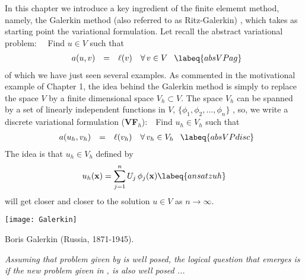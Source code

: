 In this chapter we introduce a key ingredient
of the finite elememt method, namely, the
Galerkin method (also referred to as Ritz-Galerkin) ,
which takes as starting point the variational formulation. 
Let recall the abstract variational problem:~~
Find $u \in V$ such that
\begin{equation}
\left.
\begin{array}{rll}
a(u,v) & = & \ell(v)  ~~~\forall \, v \in V \\
\end{array}
\right. \labeq{absVPag}
\end{equation}
of which we have just seen several examples.
As commented in the motivational example of Chapter 1, 
the idea behind the Galerkin method is simply to replace
the space $V$ by a finite dimensional space $V_h \subset V$.
The space $V_h$ can be spanned by a set of linearly
independent functions in $V$, $\{\phi_1,\phi_2,\dots,\phi_n\}$
,
so, we write a discrete variational
formulation (\textbf{VF}$_h$):~~Find $u_h \in V_h$ such that
\begin{equation}
\left.
\begin{array}{rll}
a(u_h,v_h) & = & \ell(v_h)  ~~~\forall \,v_h \in V_h \\
\end{array}
\right. \labeq{absVPdisc}
\end{equation}
The idea is that $u_h \in V_h$ defined by
\begin{equation}
u_h(\mathbf{x}) = \sum_{j=1}^{n}{U_j \, \phi_j(\mathbf{x})} \labeq{ansatzuh}
\end{equation}
will get closer and closer to the solution $u \in V$
as $n \rightarrow \infty$.
\begin{marginfigure}[-6.0cm]
        \texttt{[image: Galerkin]}
	\caption[]{Boris Galerkin (Russia, 1871-1945).}
\end{marginfigure}

\bigskip

\emph{Assuming that problem given by  is well posed, 
the logical question that emerges is if the new problem
given in , is also well posed ...}

